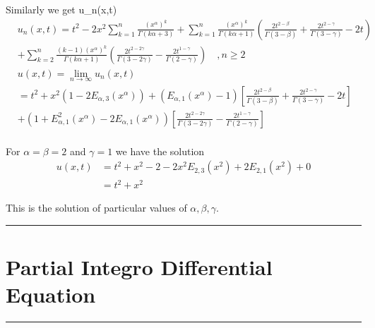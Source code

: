 \documentclass[12pt, a4paper]{report}
\begin{document}
Similarly we get u_n(x,t)\\
$$
\begin{aligned}
& u_n(x, t)=t^2-2 x^2 \sum_{k=1}^n \frac{\left(x^\alpha\right)^k}{\Gamma(k \alpha+3)}+\sum_{k=1}^n \frac{\left(x^\alpha\right)^k}{\Gamma(k \alpha+1)}\left(\frac{2 t^{2-\beta}}{\Gamma(3-\beta)}+\frac{2 t^{2-\gamma}}{\Gamma(3-\gamma)}-2 t\right) \\
& +\sum_{k=2}^n \frac{(k-1)\left(x^\alpha\right)^k}{\Gamma(k \alpha+1)}\left(\frac{2 t^{2-2 \gamma}}{\Gamma(3-2 \gamma)}-\frac{2 t^{1-\gamma}}{\Gamma(2-\gamma)}\right) \quad, n \geq 2 \\
& u(x, t)=\lim _{n \rightarrow \infty} u_n(x, t) \\
& =t^2+x^2\left(1-2 E_{\alpha, 3}\left(x^\alpha\right)\right)+\left(E_{\alpha, 1}\left(x^\alpha\right)-1\right)\left[\frac{2 t^{2-\beta}}{\Gamma(3-\beta)}+\frac{2 t^{2-\gamma}}{\Gamma(3-\gamma)}-2 t\right] \\
& +\left(1+E_{\alpha, 1}^2\left(x^\alpha\right)-2 E_{\alpha, 1}\left(x^\alpha\right)\right)\left[\frac{2 t^{2-2 \gamma}}{\Gamma(3-2 \gamma)}-\frac{2 t^{1-\gamma}}{\Gamma(2-\gamma)}\right] \\
&
\end{aligned}
$$

For $\alpha=\beta=2$ and $\gamma=1$ we have the solution
$$
\begin{aligned}
u(x, t) & =t^2+x^2-2-2 x^2 E_{2,3}\left(x^2\right)+2 E_{2,1}\left(x^2\right)+0 \\
& =t^2+x^2
\end{aligned}
$$

This is the solution of particular values of $\alpha, \beta, \gamma$.

\clearpage

\bigskip %

\rule{\textwidth}{1.4pt} %

\bigskip %

\chapter{\textbf{\LARGE Partial Integro Differential Equation}}
\bigskip %

\rule{\textwidth}{1.4pt} %

\bigskip %
\end{document}

